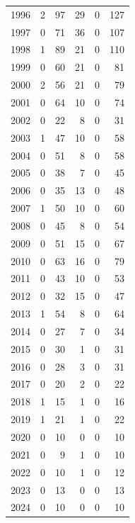 \documentclass[
]{scrartcl}
\begin{document}
\begin{longtable}{rrrrrr}
1996 & 2 & 97 & 29 & 0 & 127 \\ 
1997 & 0 & 71 & 36 & 0 & 107 \\ 
1998 & 1 & 89 & 21 & 0 & 110 \\ 
1999 & 0 & 60 & 21 & 0 & 81 \\ 
2000 & 2 & 56 & 21 & 0 & 79 \\ 
2001 & 0 & 64 & 10 & 0 & 74 \\ 
2002 & 0 & 22 & 8 & 0 & 31 \\ 
2003 & 1 & 47 & 10 & 0 & 58 \\ 
2004 & 0 & 51 & 8 & 0 & 58 \\ 
2005 & 0 & 38 & 7 & 0 & 45 \\ 
2006 & 0 & 35 & 13 & 0 & 48 \\ 
2007 & 1 & 50 & 10 & 0 & 60 \\ 
2008 & 0 & 45 & 8 & 0 & 54 \\ 
2009 & 0 & 51 & 15 & 0 & 67 \\ 
2010 & 0 & 63 & 16 & 0 & 79 \\ 
2011 & 0 & 43 & 10 & 0 & 53 \\ 
2012 & 0 & 32 & 15 & 0 & 47 \\ 
2013 & 1 & 54 & 8 & 0 & 64 \\ 
2014 & 0 & 27 & 7 & 0 & 34 \\ 
2015 & 0 & 30 & 1 & 0 & 31 \\ 
2016 & 0 & 28 & 3 & 0 & 31 \\ 
2017 & 0 & 20 & 2 & 0 & 22 \\ 
2018 & 1 & 15 & 1 & 0 & 16 \\ 
2019 & 1 & 21 & 1 & 0 & 22 \\ 
2020 & 0 & 10 & 0 & 0 & 10 \\ 
2021 & 0 & 9 & 1 & 0 & 10 \\ 
2022 & 0 & 10 & 1 & 0 & 12 \\ 
2023 & 0 & 13 & 0 & 0 & 13 \\ 
2024 & 0 & 10 & 0 & 0 & 10 \\ 
\bottomrule

\end{longtable}

\endgroup

\newpage{}

\begingroup
\fontsize{9.0pt}{10.8pt}\selectfont
\end{document}
